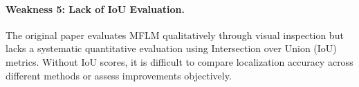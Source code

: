 \paragraph{Weakness 5: Lack of IoU Evaluation.} The original paper evaluates MFLM qualitatively through visual inspection but lacks a systematic quantitative evaluation using Intersection over Union (IoU) metrics. Without IoU scores, it is difficult to compare localization accuracy across different methods or assess improvements objectively.
